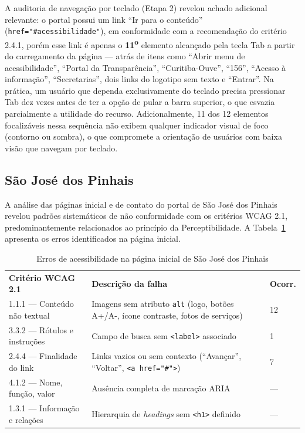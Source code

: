 \documentclass[brazil]{ifpr-pinhais}
\begin{document}
A auditoria de navegação por teclado (Etapa 2) revelou achado adicional relevante: o portal possui um link ``Ir para o conteúdo'' (\texttt{href="\#acessibilidade"}), em conformidade com a recomendação do critério 2.4.1, porém esse link é apenas o \textbf{11\textsuperscript{o}} elemento alcançado pela tecla Tab a partir do carregamento da página --- atrás de itens como ``Abrir menu de acessibilidade'', ``Portal da Transparência'', ``Curitiba-Ouve'', ``156'', ``Acesso à informação'', ``Secretarias'', dois links do logotipo sem texto e ``Entrar''. Na prática, um usuário que dependa exclusivamente do teclado precisa pressionar Tab dez vezes antes de ter a opção de pular a barra superior, o que esvazia parcialmente a utilidade do recurso. Adicionalmente, 11 dos 12 elementos focalizáveis nessa sequência não exibem qualquer indicador visual de foco (contorno ou sombra), o que compromete a orientação de usuários com baixa visão que navegam por teclado.

\subsection{São José dos Pinhais}
\label{subsec:sjp}

A análise das páginas inicial e de contato do portal de São José dos Pinhais revelou padrões sistemáticos de não conformidade com os critérios WCAG 2.1, predominantemente relacionados ao princípio da Perceptibilidade. A Tabela~\ref{tab:sjp} apresenta os erros identificados na página inicial.

\begin{table}[htb]
\caption{Erros de acessibilidade na página inicial de São José dos Pinhais}
\label{tab:sjp}
\begin{tabular}{p{3.8cm} p{7cm} p{1.5cm}}
\rowcolor{headerblue}
\color{white}\textbf{Critério WCAG 2.1} & \color{white}\textbf{Descrição da falha} & \color{white}\textbf{Ocorr.} \\
1.1.1 — Conteúdo não textual & Imagens sem atributo \texttt{alt} (logo, botões A+/A-, ícone contraste, fotos de serviços) & 12 \\
3.3.2 — Rótulos e instruções & Campo de busca sem \texttt{<label>} associado & 1 \\
2.4.4 — Finalidade do link   & Links vazios ou sem contexto (``Avançar'', ``Voltar'', \texttt{<a href="\#">}) & 7 \\
4.1.2 — Nome, função, valor  & Ausência completa de marcação ARIA & --- \\
1.3.1 — Informação e relações & Hierarquia de \textit{headings} sem \texttt{<h1>} definido & --- \\
\end{tabular}
\end{table}
\end{document}
